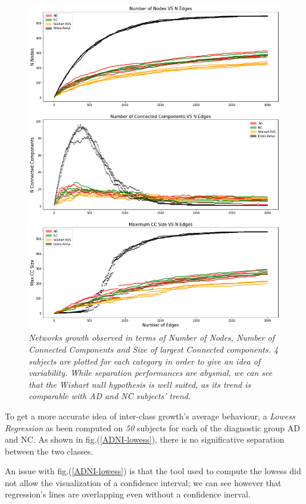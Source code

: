 \documentclass[12pt,openright,twoside,a4paper]{book}
\begin{document}
\begin{figure}[!h]
\centering
\includegraphics[scale=0.5]{ADNI-Ngrowth}
\caption{\textit{Networks growth observed in terms of Number of Nodes, Number of Connected Components and Size of largest Connected components. 4 subjects are plotted for each category in order to give an idea of variability. While separation performances are abysmal, we can see that the Wishart null hypothesis is well suited, as its trend is comparable with AD and NC subjects' trend. }}
\label{ADNI-Ngrowth}
\end{figure}

\clearpage

To get a more accurate idea of inter-class growth's average behaviour, a \textit{Lowess Regression} \cite{Lowess} as been computed on \textit{50} subjects for each of the diagnostic group AD and NC.
As shown in fig.(\ref{ADNI-lowess}), there is no significative separation between the two classes.

An issue with fig.(\ref{ADNI-lowess}) is that the tool used to compute the lowess did not allow the visualization of a confidence interval; we can see however that regression's lines are overlapping even without a confidence inerval. 
\end{document}

